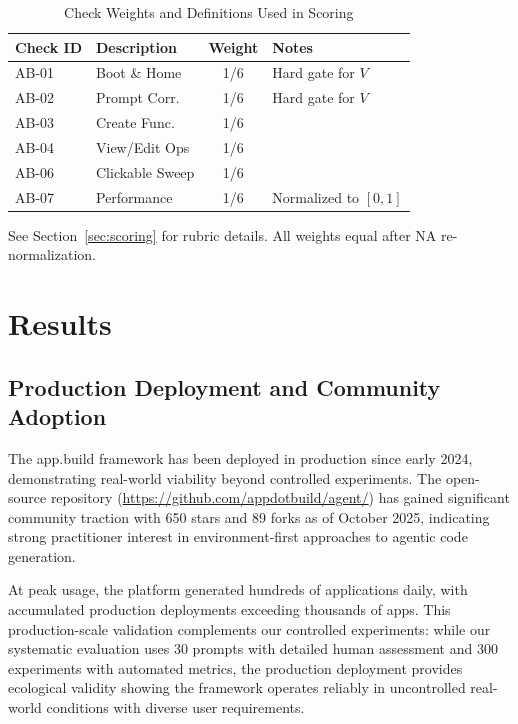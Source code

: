 \documentclass[conference]{IEEEtran}
\begin{document}
\begin{table}[!t]
\caption{Check Weights and Definitions Used in Scoring}
\label{tab:check-weights}
\centering
\small
\begin{threeparttable}
\begin{tabular}{@{}llcp{3cm}@{}}
\toprule
\textbf{Check ID} & \textbf{Description} & \textbf{Weight} & \textbf{Notes} \\
\midrule
AB-01 & Boot \& Home & 1/6 & Hard gate for $V$ \\
AB-02 & Prompt Corr. & 1/6 & Hard gate for $V$ \\
AB-03 & Create Func. & 1/6 &  \\
AB-04 & View/Edit Ops & 1/6 &  \\
AB-06 & Clickable Sweep & 1/6 &  \\
AB-07 & Performance & 1/6 & Normalized to $[0,1]$ \\
\bottomrule
\end{tabular}
\begin{tablenotes}\footnotesize
\item See Section~\ref{sec:scoring} for rubric details. All weights equal after NA re-normalization.
\end{tablenotes}
\end{threeparttable}
\end{table}

\section{Results}
\label{sec:results}

\subsection{Production Deployment and Community Adoption}

The app.build framework has been deployed in production since early 2024, demonstrating real-world viability beyond controlled experiments. The open-source repository (\url{https://github.com/appdotbuild/agent/}) has gained significant community traction with 650 stars and 89 forks as of October 2025, indicating strong practitioner interest in environment-first approaches to agentic code generation.

At peak usage, the platform generated hundreds of applications daily, with accumulated production deployments exceeding thousands of apps. This production-scale validation complements our controlled experiments: while our systematic evaluation uses 30 prompts with detailed human assessment and 300 experiments with automated metrics, the production deployment provides ecological validity showing the framework operates reliably in uncontrolled real-world conditions with diverse user requirements.
\end{document}
